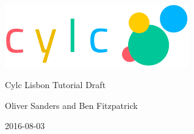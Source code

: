 \thispagestyle{empty}

\begin{titlepage}
    \begin{center}
        \includegraphics[width=0.6\textwidth]{resources/tex/cylc-logo}

        \Huge{Cylc Lisbon Tutorial Draft}

        \large{Oliver Sanders and Ben Fitzpatrick}

        \small{2016-08-03}
    \end{center}

\tableofcontents
\end{titlepage}
